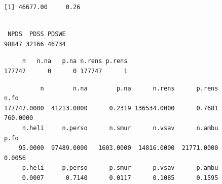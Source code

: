 \documentclass[]{article}
\newenvironment{Shaded}{\begin{snugshade}}{\end{snugshade}}
\newcommand{\KeywordTok}[1]{\textcolor[rgb]{0.13,0.29,0.53}{\textbf{{#1}}}}
\newcommand{\CommentTok}[1]{\textcolor[rgb]{0.56,0.35,0.01}{\textit{{#1}}}}
\newcommand{\NormalTok}[1]{{#1}}
\begin{document}
\begin{verbatim}
[1] 46677.00     0.26
\end{verbatim}

\begin{Shaded}
\end{Shaded}

\begin{verbatim}

 NPDS  PDSS PDSWE 
98847 32166 46734 
\end{verbatim}

\begin{Shaded}
\end{Shaded}

\begin{verbatim}
     n   n.na   p.na n.rens p.rens 
177747      0      0 177747      1 
\end{verbatim}

\begin{Shaded}
\end{Shaded}

\begin{verbatim}
          n        n.na        p.na      n.rens      p.rens        n.fo 
177747.0000  41213.0000      0.2319 136534.0000      0.7681    760.0000 
     n.heli     n.perso      n.smur      n.vsav      n.ambu        p.fo 
    95.0000  97489.0000   1603.0000  14816.0000  21771.0000      0.0056 
     p.heli     p.perso      p.smur      p.vsav      p.ambu 
     0.0007      0.7140      0.0117      0.1085      0.1595 
\end{verbatim}

\begin{Shaded}
\end{Shaded}
\end{document}
